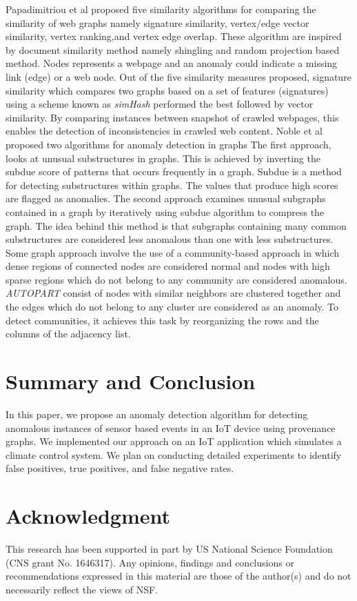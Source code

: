 Papadimitriou et al \cite{Papadimitriou2010} proposed five similarity algorithms for comparing the similarity of web graphs namely signature similarity, vertex/edge vector similarity, vertex ranking,and vertex edge overlap. These algorithm are inspired by document similarity method namely shingling and random projection based method. Nodes represents a webpage and  an anomaly could indicate a missing link (edge) or a web node. Out of the five similarity measures proposed, signature similarity which compares two graphs based on a set of features (signatures) using a scheme known as \textit{simHash} performed the best followed by vector similarity. By comparing instances between snapshot of crawled webpages, this enables the detection of inconsistencies in crawled web content. Noble et al \cite{Noble} proposed two algorithms for anomaly detection in graphs The first approach, looks at unusual substructures in graphs. This is achieved by inverting the subdue score of patterns that occurs frequently in a graph. Subdue is a method for detecting substructures within graphs. The values that produce high scores are flagged as anomalies. The second approach examines unusual subgraphs contained in a graph by iteratively using subdue algorithm to compress the graph. The idea behind this method is that subgraphs containing many common substructures are considered less anomalous than one with less substructures. Some graph approach involve the use of a community-based approach in which dense regions of connected nodes are considered normal and nodes with high sparse regions which do not belong to any community are considered anomalous. \textit{AUTOPART} \cite{chakrabarti2004autopart} consist of nodes with similar neighbors are clustered together and the edges which do not belong to any cluster are considered as an anomaly. To detect communities, it achieves this task by reorganizing the rows and the columns of the adjacency list.



\section{Summary and Conclusion}

In this paper, we propose an anomaly detection algorithm for detecting anomalous instances of sensor based events in an IoT device using provenance graphs. We implemented our approach on an IoT application which simulates a climate control system. We plan on conducting detailed experiments to identify false positives, true positives, and false negative rates. 




\section{Acknowledgment}
This research has been supported in part by US National Science Foundation (CNS grant No. 1646317). Any opinions, findings and conclusions or recommendations expressed in this material are those of the author(s) and do not necessarily reflect the views of NSF.



